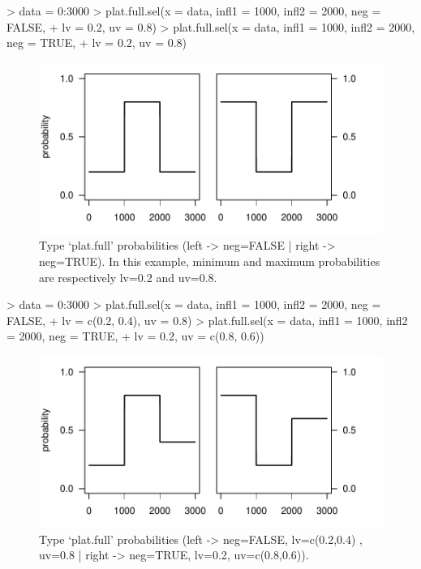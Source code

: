 \documentclass[letterpaper, 12pt]{article}
\begin{document}
\begin{Schunk}
\begin{Sinput}
> data = 0:3000
> plat.full.sel(x = data, infl1 = 1000, infl2 = 2000, neg = FALSE, 
+     lv = 0.2, uv = 0.8)
> plat.full.sel(x = data, infl1 = 1000, infl2 = 2000, neg = TRUE, 
+     lv = 0.2, uv = 0.8)
\end{Sinput}
\end{Schunk}
\begin{figure}[h]
\vspace{-20pt}
\begin{center}
\includegraphics{relation_sel-011}
\end{center}
\vspace{-30pt}
\caption{Type `plat.full' probabilities (left -> neg=FALSE |  right -> neg=TRUE). In this example, minimum and maximum probabilities are respectively lv=0.2 and uv=0.8.}
\vspace{-10pt}
\label{fig5}
\end{figure}

\begin{Schunk}
\begin{Sinput}
> data = 0:3000
> plat.full.sel(x = data, infl1 = 1000, infl2 = 2000, neg = FALSE, 
+     lv = c(0.2, 0.4), uv = 0.8)
> plat.full.sel(x = data, infl1 = 1000, infl2 = 2000, neg = TRUE, 
+     lv = 0.2, uv = c(0.8, 0.6))
\end{Sinput}
\end{Schunk}
\begin{figure}[h]
\vspace{-20pt}
\begin{center}
\includegraphics{relation_sel-013}
\end{center}
\vspace{-30pt}
\caption{Type `plat.full' probabilities (left -> neg=FALSE, lv=c(0.2,0.4) , uv=0.8 | right -> neg=TRUE, lv=0.2, uv=c(0.8,0.6)).}
\vspace{-10pt}
\label{fig6}
\end{figure}
\end{document}
